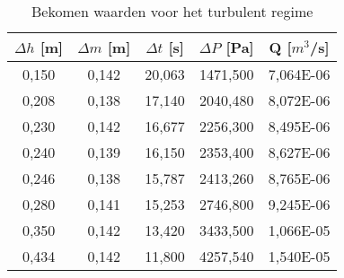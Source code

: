 \begin{table}
    \centering
    \caption{Bekomen waarden voor het turbulent regime}
    \begin{tabular}{| c | c | c | c | c |}
        \hline
        $\Delta h$ [m]  & $\Delta m$ [m]    & $\Delta t$ [s]    & $\Delta P$ [Pa]    & Q [$m^3$/s]      \\ \hline
        0,150           & 0,142             & 20,063            & 1471,500           & 7,064E-06        \\ \hline
        0,208           & 0,138             & 17,140            & 2040,480           & 8,072E-06         \\ \hline
        0,230           & 0,142             & 16,677            & 2256,300           & 8,495E-06         \\ \hline
        0,240           & 0,139             & 16,150            & 2353,400           & 8,627E-06         \\ \hline 
        0,246           & 0,138             & 15,787            & 2413,260           & 8,765E-06         \\ \hline
        0,280           & 0,141             & 15,253            & 2746,800           & 9,245E-06         \\ \hline
        0,350           & 0,142             & 13,420            & 3433,500           & 1,066E-05         \\ \hline
        0,434           & 0,142             & 11,800            & 4257,540           & 1,540E-05         \\ \hline
    \end{tabular}
\end{table}

